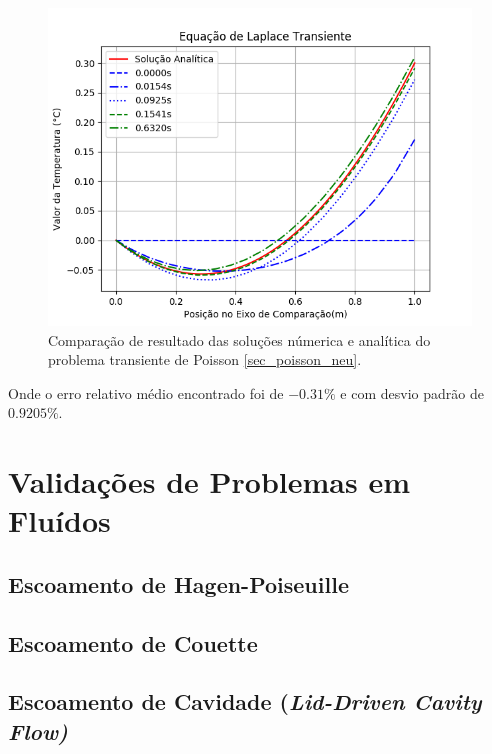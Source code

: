 \begin{figure}[H]
    \centering
    \includegraphics[width=.7\linewidth]{figures/poisson_neumann_transient_comparison.png}
    \caption{Comparação de resultado das soluções númerica e analítica do problema transiente de Poisson \ref{sec_poisson_neu}.}
    \label{poisson_n_trans_comp}
\end{figure}
Onde o erro relativo médio encontrado foi de $-0.31\%$ e com desvio padrão de $0.9205\%$.

\section{\textbf{Validações de Problemas em Fluídos}}
\subsection{\textbf{Escoamento de Hagen-Poiseuille}}
\subsection{\textbf{Escoamento de Couette}}
\subsection{\textbf{Escoamento de Cavidade (\it{Lid-Driven Cavity Flow})}}
